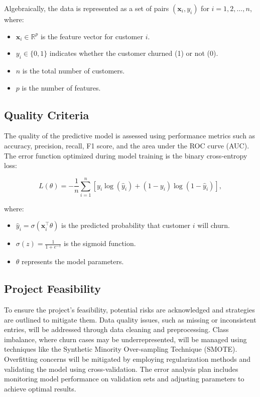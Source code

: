 \documentclass[12pt]{article}
\begin{document}
Algebraically, the data is represented as a set of pairs \((\mathbf{x}_i, y_i)\) for \(i = 1, 2, \dots, n\), where:

\begin{itemize}
    \item \(\mathbf{x}_i \in \mathbb{R}^p\) is the feature vector for customer \(i\).
    \item \(y_i \in \{0,1\}\) indicates whether the customer churned (1) or not (0).
    \item \(n\) is the total number of customers.
    \item \(p\) is the number of features.
\end{itemize}

\subsection*{Quality Criteria}

The quality of the predictive model is assessed using performance metrics such as accuracy, precision, recall, F1 score, and the area under the ROC curve (AUC). The error function optimized during model training is the binary cross-entropy loss:

\[
L(\theta) = -\frac{1}{n} \sum_{i=1}^{n} \left[ y_i \log(\hat{y}_i) + (1 - y_i) \log(1 - \hat{y}_i) \right],
\]

where:

\begin{itemize}
    \item \(\hat{y}_i = \sigma(\mathbf{x}_i^\top \theta)\) is the predicted probability that customer \(i\) will churn.
    \item \(\sigma(z) = \frac{1}{1 + e^{-z}}\) is the sigmoid function.
    \item \(\theta\) represents the model parameters.
\end{itemize}

\subsection*{Project Feasibility}

To ensure the project's feasibility, potential risks are acknowledged and strategies are outlined to mitigate them. Data quality issues, such as missing or inconsistent entries, will be addressed through data cleaning and preprocessing. Class imbalance, where churn cases may be underrepresented, will be managed using techniques like the Synthetic Minority Over-sampling Technique (SMOTE). Overfitting concerns will be mitigated by employing regularization methods and validating the model using cross-validation. The error analysis plan includes monitoring model performance on validation sets and adjusting parameters to achieve optimal results.
\end{document}
